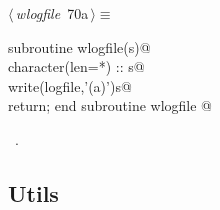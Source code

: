 \documentclass[10pt,a4paper,notitlepage]{article}
\begin{document}
\begin{flushleft} \small
\begin{minipage}{\linewidth}\label{scrap76}\raggedright\small
{} $\langle\,${\it wlogfile}\nobreak\ {\footnotesize {70a}}$\,\rangle\equiv$
\vspace{-1ex}
\begin{list}{}{} \item
\mbox{}\verb@      subroutine wlogfile(s)@\\
\mbox{}\verb@      character(len=*) :: s@\\
\mbox{}\verb@      write(logfile,'(a)')s@\\
\mbox{}\verb@      return; end subroutine wlogfile                                        @{\NWsep}
\end{list}
\vspace{-1.5ex}
\footnotesize
\begin{list}{}{\setlength{\itemsep}{-\parsep}\setlength{\itemindent}{-\leftmargin}}
\item \NWtxtMacroRefIn\ .

\item{}
\end{list}
\end{minipage}\vspace{4ex}
\end{flushleft}
\subsection{Utils}
\end{document}
